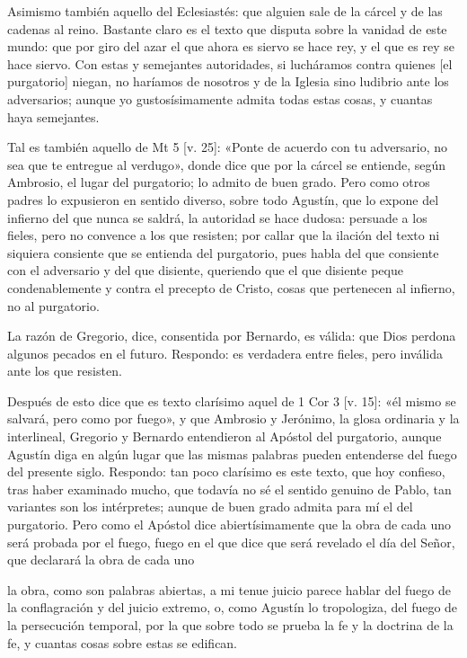 Asimismo también aquello del Eclesiastés: que alguien sale de la cárcel y de las cadenas al reino. Bastante claro es el texto que disputa sobre la vanidad de este mundo: que por giro del azar el que ahora es siervo se hace rey, y el que es rey se hace siervo. Con estas y semejantes autoridades, si lucháramos contra quienes [el purgatorio] niegan, no haríamos de nosotros y de la Iglesia sino ludibrio ante los adversarios; aunque yo gustosísimamente admita todas estas cosas, y cuantas haya semejantes.

Tal es también aquello de Mt 5 [v. 25]: «Ponte de acuerdo con tu adversario, no sea que te entregue al verdugo», donde dice que por la cárcel se entiende, según Ambrosio, el lugar del purgatorio; lo admito de buen grado. Pero como otros padres lo expusieron en sentido diverso, sobre todo Agustín, que lo expone del infierno del que nunca se saldrá, la autoridad se hace dudosa: persuade a los fieles, pero no convence a los que resisten; por callar que la ilación del texto ni siquiera consiente que se entienda del purgatorio, pues habla del que consiente con el adversario y del que disiente, queriendo que el que disiente peque condenablemente y contra el precepto de Cristo, cosas que pertenecen al infierno, no al purgatorio.

La razón de Gregorio, dice, consentida por Bernardo, es válida: que Dios perdona algunos pecados en el futuro. Respondo: es verdadera entre fieles, pero inválida ante los que resisten.

Después de esto dice que es texto clarísimo aquel de 1 Cor 3 [v. 15]: «él mismo se salvará, pero como por fuego», y que Ambrosio y Jerónimo, la glosa ordinaria y la interlineal, Gregorio y Bernardo entendieron al Apóstol del purgatorio, aunque Agustín diga en algún lugar que las mismas palabras pueden entenderse del fuego del presente siglo. Respondo: tan poco clarísimo es este texto, que hoy confieso, tras haber examinado mucho, que todavía no sé el sentido genuino de Pablo, tan variantes son los intérpretes; aunque de buen grado admita para mí el del purgatorio. Pero como el Apóstol dice abiertísimamente que la obra de cada uno será probada por el fuego, fuego en el que dice que será revelado el día del Señor, que declarará la obra de cada uno

la obra, como son palabras abiertas, a mi tenue juicio parece hablar del fuego de la conflagración y del juicio extremo, o, como Agustín lo tropologiza, del fuego de la persecución temporal, por la que sobre todo se prueba la fe y la doctrina de la fe, y cuantas cosas sobre estas se edifican.

